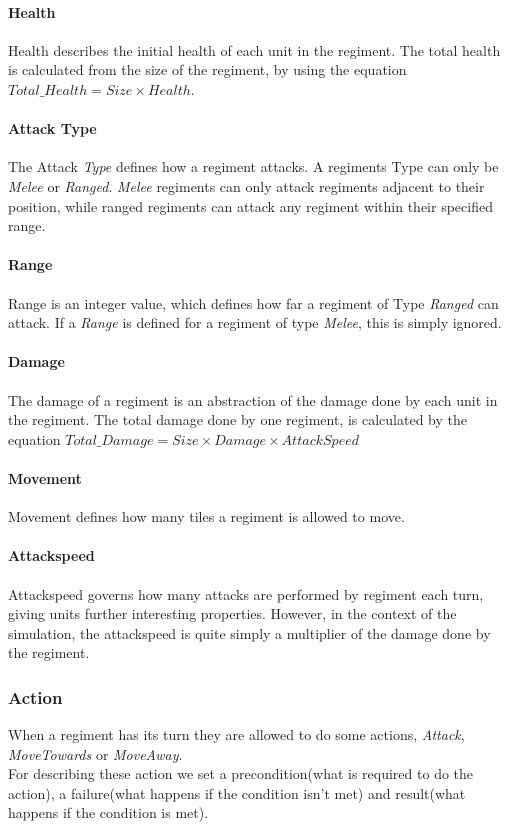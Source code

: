		\paragraph{Health}
		Health describes the initial health of each unit in the regiment.
		The total health is calculated from the size of the regiment, by using the equation $Total\_Health = Size \times Health$.
		
		\paragraph{Attack Type}
		The Attack \textit{Type} defines how a regiment attacks. A regiments Type can only be \textit{Melee} or \textit{Ranged}.
		\textit{Melee} regiments can only attack regiments adjacent to their position, while ranged regiments 
		can attack any regiment within their specified range.
		
		\paragraph{Range}
		Range is an integer value, which defines how far a regiment of Type \textit{Ranged} can attack. 
		If a \textit{Range} is defined for a regiment of type \textit{Melee}, this is simply ignored.
		
		\paragraph{Damage}
		The damage of a regiment is an abstraction of the damage done by each unit in the regiment.
		The total damage done by one regiment, is calculated by the equation $Total\_Damage = Size \times Damage \times AttackSpeed$ 
		
		\paragraph{Movement}
		Movement defines how many tiles a regiment is allowed to move.
		
		\paragraph{Attackspeed}
		Attackspeed governs how many attacks are performed by regiment each turn, giving units further interesting properties. 
		However, in the context of the simulation, the attackspeed is quite simply a multiplier of the damage done by the regiment.
		
		\subsubsection{Action}
		\label{rules:action}
		When a regiment has its turn they are allowed to do some actions, \textit{Attack}, \textit{MoveTowards} or \textit{MoveAway}. \\
		For describing these action we set a precondition(what is required to do the action), a failure(what happens if the condition isn't met)
		and result(what happens if the condition is met).
		
